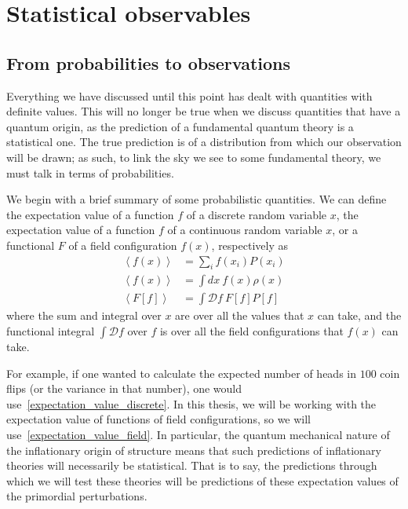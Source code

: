\section{Statistical observables}
\subsection{From probabilities to observations}\label{corr_functions}
    Everything we have discussed until this point has dealt with quantities
    with definite values. This will no longer
    be true when we discuss quantities that have a quantum origin, as
    the prediction of a fundamental quantum theory is a statistical one.
    The true prediction is of a distribution from which our observation will be drawn;
    as such, to link the sky we see to some fundamental theory,
    we must talk in terms of probabilities.


    We begin with a brief summary of some probabilistic quantities.
    We can define the expectation value of a function $f$ of a discrete random variable $x$,
    the expectation value of a function $f$ of a continuous random variable $x$,
    or a functional $F$ of a field configuration $f(x)$, respectively as
    \begin{align}
        \left<f(x)\right> &= \sum_i f(x_i) P(x_i)\label{expectation_value_discrete}\\
        \left<f(x)\right> &= \int dx~f(x) \rho(x)\label{expectation_value_cont}\\
        \left<F\left[f\right]\right> &= \int \mathcal{D}f~F\left[f\right] P\left[f\right]\label{expectation_value_field}
    \end{align}
    where the sum and integral over $x$ are over all the values that $x$ can take,
    and the functional integral $\int \mathcal{D}f$ over $f$ is over all the field configurations
    that $f(x)$ can take.


    For example, if one wanted to
    calculate the expected number of heads in $100$
    coin flips (or the variance in that number),
    one would use~\eqref{expectation_value_discrete}.
    In this thesis, we will be working with the expectation value of
    functions of field configurations, so we will use~\eqref{expectation_value_field}.
    In particular, the quantum mechanical nature of the inflationary
    origin of structure means that such predictions
    of inflationary theories will necessarily be statistical. That is to say, the predictions through
    which we will test these theories will be predictions of these expectation
    values of the primordial perturbations.


